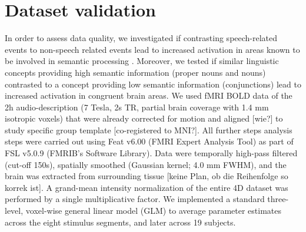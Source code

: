 \documentclass[10pt,a4paper,onecolumn]{article}
\begin{document}
\section*{Dataset validation}
In order to assess data quality, we investigated if contrasting speech-related events to non-speech related events lead to increased activation in areas known to be involved in semantic processing \citep{binder2009semantic, dewitt2012phoneme}.
Moreover, we tested if similar linguistic concepts providing high semantic information (proper nouns and nouns) contrasted to a concept providing low semantic information (conjunctions) lead to increased activation in congruent brain areas.
We used fMRI BOLD data of the 2h audio-description (7 Tesla, 2s TR, partial
brain coverage with 1.4 mm isotropic voxels) \citep{hanke2014audiomovie} that
were already corrected for motion and aligned [wie?] to study specific group template [co-registered to MNI?].
All further steps analysis steps were carried out using Feat v6.00 (FMRI Expert
Analysis Tool)\citep{woolrich2001autocorr} as part of FSL v5.0.9 (FMRIB’s
Software Library)\citep{smith2004fsl}. Data were temporally high-pass filtered (cut-off 150s), spatially smoothed (Gaussian kernel; 4.0 mm FWHM), and the brain was extracted from surrounding tissue [keine Plan, ob die Reihenfolge so korrek ist]. A grand-mean intensity normalization of the entire 4D dataset was performed by a single multiplicative factor.
We implemented a standard three-level, voxel-wise general linear model (GLM) to average parameter estimates across the eight stimulus segments, and later across 19 subjects.
\end{document}
